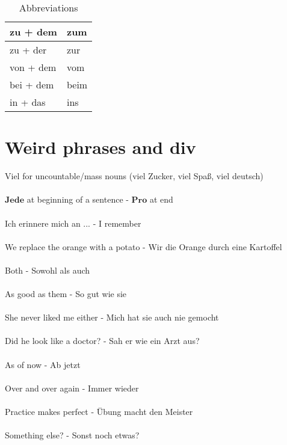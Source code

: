 \documentclass{article}
\begin{document}
\begin{table}[H]
    \centering
    \begin{tabu} to 0.4\textwidth { | X[l] | X[r] | }
        \hline
        zu + dem & zum\\
        \hline
        zu + der &  zur\\
        \hline
        von + dem &  vom\\
        \hline
        bei + dem &  beim\\
        \hline
        in + das &  ins\\
        \hline
    \end{tabu}
    \caption{Abbreviations}
    \label{tab:abbreviations}
\end{table}


\section{Weird phrases and div}
Viel for uncountable/mass nouns (viel Zucker, viel Spaß, viel deutsch) 
\\ \\
$\textbf{Jede}$ at beginning of a sentence - $\textbf{Pro}$ at end
\\ \\
Ich erinnere mich an ... - I remember
\\ \\
We replace the orange with a potato - Wir  die Orange durch eine Kartoffel
\\ \\
Both - Sowohl als auch
\\ \\
As good as them - So gut wie sie
\\ \\
She never liked me either - Mich hat sie auch nie gemocht
\\ \\
Did he look like a doctor? - Sah er wie ein Arzt aus?
\\ \\
As of now - Ab jetzt
\\ \\
Over and over again - Immer wieder
\\ \\
Practice makes perfect - Übung macht den Meister
\\ \\
Something else? - Sonst noch etwas?
\end{document}
